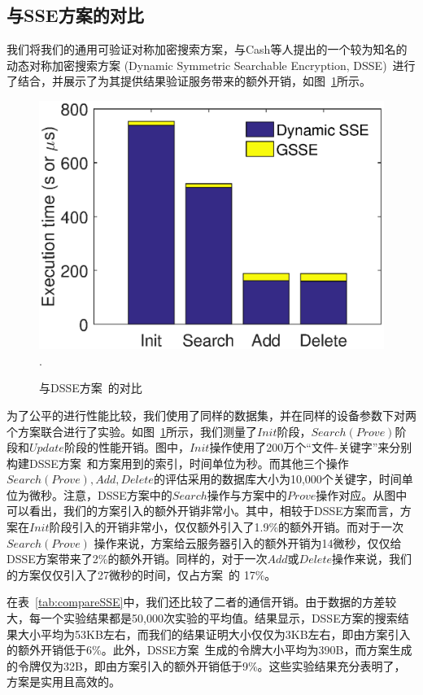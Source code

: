 \subsection{与SSE方案的对比}
我们将我们的通用可验证对称加密搜索方案\single ，与Cash等人提出的一个较为知名的动态对称加密搜索方案 (Dynamic Symmetric Searchable Encryption, DSSE)~\cite{cash2014dynamic}进行了结合，并展示了\single 为其提供结果验证服务带来的额外开销，如图~\ref{fig:comparison}所示。
\begin{figure}[h]
\centering
\includegraphics[width=3.5 in]{expr/comparison}
\DeclareGraphicsExtensions.
\caption{与DSSE方案~\cite{cash2014dynamic}的对比}
\label{fig:comparison}
\end{figure}
为了公平的进行性能比较，我们使用了同样的数据集，并在同样的设备参数下对两个方案联合进行了实验。如图~\ref{fig:comparison}所示，我们测量了$Init$阶段，$Search(Prove)$阶段和$Update$阶段的性能开销。图中，$Init$操作使用了200万个“文件-关键字”来分别构建DSSE方案~\cite{cash2014dynamic}和方案\single 用到的索引，时间单位为秒。而其他三个操作$Search(Prove), Add, Delete$的评估采用的数据库大小为10,000个关键字，时间单位为微秒。注意，DSSE方案中的$Search$操作与\single 方案中的$Prove$操作对应。从图中可以看出，我们的\single 方案引入的额外开销非常小。其中，相较于DSSE方案而言，方案\single 在$Init$阶段引入的开销非常小，仅仅额外引入了1.9\%的额外开销。而对于一次$Search(Prove)$ 操作来说，\single 方案给云服务器引入的额外开销为14微秒，仅仅给DSSE方案带来了2\%的额外开销。同样的，对于一次$Add$或$Delete$操作来说，我们的\single 方案仅仅引入了27微秒的时间，仅占方案~\cite{cash2014dynamic}的 17\%。

在表~\ref{tab:compareSSE}中，我们还比较了二者的通信开销。由于数据的方差较大，每一个实验结果都是50,000次实验的平均值。结果显示，DSSE方案的搜索结果大小平均为53KB左右，而我们的结果证明大小仅仅为3KB左右，即由\single 方案引入的额外开销低于6\%。此外，DSSE方案~\cite{cash2014dynamic}生成的令牌大小平均为390B，而\single 方案生成的令牌仅为32B，即由\single 方案引入的额外开销低于9\%。这些实验结果充分表明了，\single 方案是实用且高效的。




